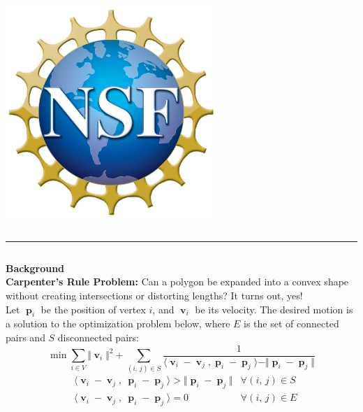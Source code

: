 \documentclass{beamer}
\DeclareMathOperator*{\vv}{\mathbf{v}}
\DeclareMathOperator*{\pp}{\mathbf{p}}
\begin{document}
\begin{frame}
{\begin{columns}
            {%
            \hspace{-2cm}
            \includegraphics[width=0.6\textwidth]{figures/nsf.png}}
    \end{columns}
}
\vspace{1cm}
\noindent\rule{117cm}{0.4pt}
\vspace{0.01pt}
    \begin{columns}[t]
        {\centering \large \textbf{Background} \\}
        \textbf{Carpenter's Rule Problem:} Can a polygon be expanded into a convex shape without creating intersections or distorting lengths? It turns out, yes! \\
        
        \vspace{1cm}
        Let ${\pp}_i$ be the position of vertex $i$, and ${\vv}_i$ be its velocity. The desired motion is a solution to the optimization problem below, where $E$ is the set of connected pairs and $S$ disconnected pairs:
        \begin{equation*}
            \min \sum_{i \in V} \Vert {\vv}_i \Vert^2 + \sum_{(i,\,j) \in S} \frac{1}{\langle {\vv}_i - {\vv}_j, {\pp}_i - {\pp}_j \rangle - \Vert {\pp}_i - {\pp}_j \Vert}
        \end{equation*}
        \begin{align*}
            &\langle {\vv}_i - {\vv}_j,\ {\pp}_i - {\pp}_j \rangle > \Vert {\pp}_i - {\pp}_j \Vert &\forall (i,\,j) \in S \\
            &\langle {\vv}_i - {\vv}_j,\ {\pp}_i - {\pp}_j \rangle = 0 &\forall(i,\,j) \in E
        \end{align*}
        

\end{columns}
\end{frame}
\end{document}
